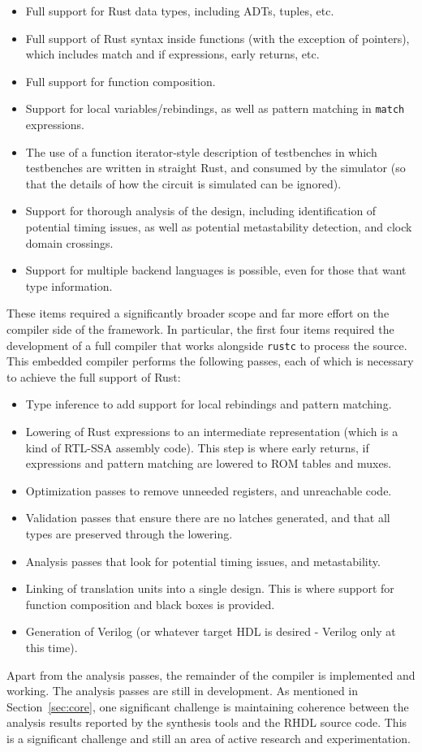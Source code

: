 \documentclass[conference]{IEEEtran}
\begin{document}
\begin{itemize}
  \item Full support for Rust data types, including ADTs, tuples, etc.
  \item Full support of Rust syntax inside functions (with the exception of pointers), which includes 
  match and if expressions, early returns, etc.
  \item Full support for function composition.
  \item Support for local variables/rebindings, as well as pattern matching in \verb|match| expressions.
  \item The use of a function iterator-style description of testbenches in which testbenches are written in 
  straight Rust, and consumed by the simulator (so that the details of how the circuit is simulated can be ignored).
  \item Support for thorough analysis of the design, including identification of potential timing issues, as well as
  potential metastability detection, and clock domain crossings.
  \item Support for multiple backend languages is possible, even for those that want type information.
\end{itemize}

These items required a significantly broader scope and far more effort on the compiler side of the framework.  In particular,
the first four items required the development of a full compiler that works alongside \verb|rustc| to process the source. 
This embedded compiler performs the following passes, each of which is necessary to achieve the full support of Rust:
\begin {itemize}
  \item Type inference to add support for local rebindings and pattern matching.
  \item Lowering of Rust expressions to an intermediate representation (which is a kind of RTL-SSA assembly code).  This
  step is where early returns, if expressions and pattern matching are lowered to ROM tables and muxes.
  \item Optimization passes to remove unneeded registers, and unreachable code.
  \item Validation passes that ensure there are no latches generated, and that all types are preserved through the lowering.
  \item Analysis passes that look for potential timing issues, and metastability.
  \item Linking of translation units into a single design.  This is where support for function composition and black boxes is
  provided.
  \item Generation of Verilog (or whatever target HDL is desired - Verilog only at this time).
\end{itemize}
Apart from the analysis passes, the remainder of the compiler is implemented and working.  The analysis passes are still in
development.  As mentioned in Section~\ref{sec:core}, one significant challenge is maintaining coherence between the analysis 
results reported by the synthesis tools and the RHDL source code.  This is a significant challenge and still an area of 
active research and experimentation.
\end{document}
